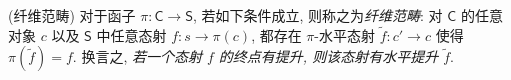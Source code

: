 \begin{definition}
	{(纤维范畴)}
	对于函子 $\pi\colon \mathsf C\to \mathsf S$,
	若如下条件成立, 则称之为\emph{纤维范畴}:
	对 $\mathsf C$ 的任意对象 $c$ 以及 $\mathsf S$ 中任意态射 $f\colon s\to \pi(c)$,
	都存在 $\pi$-水平态射 $\widetilde f\colon c'\to c$ 使得 $\pi(\widetilde f)= f$.
	换言之, \emph{若一个态射 $f$ 的终点有提升, 则该态射有水平提升 $\widetilde f$}.
\end{definition}
